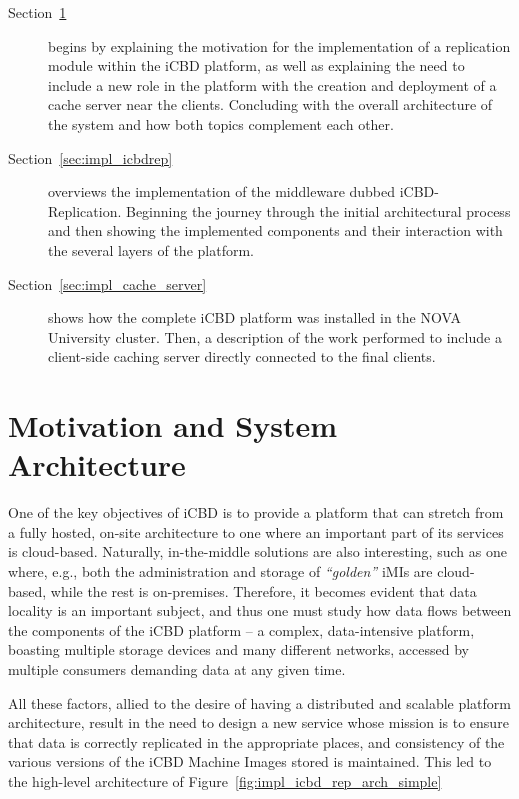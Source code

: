 \begin{description}
	\item [Section~\ref{sec:impl_mot_sysarch}] begins by explaining the motivation for the implementation of a replication module within the iCBD platform, as well as explaining the need to include a new role in the platform with the creation and deployment of a cache server near the clients. Concluding with the overall architecture of the system and how both topics complement each other.
    \item [Section~\ref{sec:impl_icbdrep}] overviews the implementation of the middleware dubbed iCBD-Replication. Beginning the journey through the initial architectural process and then showing the implemented components and their interaction with the several layers of the platform.
    \item [Section~\ref{sec:impl_cache_server}] shows how the complete iCBD platform was installed in the NOVA University cluster. Then, a description of the work performed to include a client-side caching server directly connected to the final clients.
\end{description}
\newpage

\section{Motivation and System Architecture}
\label{sec:impl_mot_sysarch}

One of the key objectives of iCBD is to provide a platform that can stretch from a fully hosted, on-site architecture to one where an important part of its services is cloud-based. Naturally, in-the-middle solutions are also interesting, such as one where, e.g., both the administration and storage of \textit{“golden”} iMIs are cloud-based, while the rest is on-premises. Therefore, it becomes evident that data locality is an important subject, and thus one must study how data flows between the components of the iCBD platform – a complex, data-intensive platform, boasting multiple storage devices and many different networks, accessed by multiple consumers demanding data at any given time.

All these factors, allied to the desire of having a distributed and scalable platform architecture, result in the need to design a new service whose mission is to ensure that data is correctly replicated in the appropriate places, and consistency of the various versions of the iCBD Machine Images stored is maintained. This led to the high-level architecture of Figure~\ref{fig:impl_icbd_rep_arch_simple}

